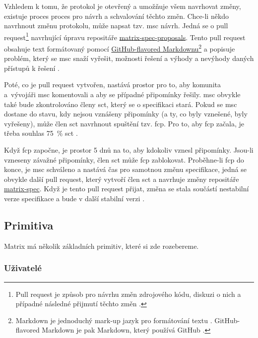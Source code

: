 Vzhledem k tomu, že protokol je otevřený a umožňuje všem navrhovat změny,
existuje proces proces pro návrh a schvalování těchto změn. Chce-li někdo
navrhnout změnu protokolu, může napsat tzv. \gls{msc} návrh. Jedná se o pull
request\footnote{ Pull request je způsob pro návrhu změn zdrojového kódu,
    diskuzi o nich a případné následné přijmutí těchto změn
    \parencite{GitHub-PullRequests}. } navrhující úpravu repositáře
\href{https://github.com/matrix-org/matrix-spec-proposals}{matrix-spec-proposals}.
Tento pull request obsahuje text formátovaný pomocí
\href{https://docs.github.com/en/get-started/writing-on-github/getting-started-with-writing-and-formatting-on-github/basic-writing-and-formatting-syntax}{GitHub-flavored
    Markdownu}\footnote{ Markdown je jednoduchý mark-up jazyk pro formátování textu
    \parencite{JohnGruber-Markdown}. GitHub-flavored Markdown je pak Markdown, který
    používá GitHub \parencite{GitHub-Markdown}. } a popisuje problém, který se
\gls{msc} snaží vyřešit, možnosti řešení a výhody a nevýhody daných přístupů k
řešení \parencite{MatrixORG-MSCs}.

Poté, co je pull request vytvořen, nastává prostor pro to, aby komunita
a~vývojáři \gls{msc} komentovali a aby se případné připomínky řešily. \gls{msc}
obvykle také bude zkontrolováno členy \gls{sct}, který se o specifikaci stará.
Pokud se \gls{msc} dostane do stavu, kdy nejsou vznášeny připomínky (a ty, co
byly vznešené, byly vyřešeny), může člen \gls{sct} navrhnout spuštění tzv.
\gls{fcp}. Pro to, aby \gls{fcp} začala, je třeba souhlas 75~\% \gls{sct}
\parencite{MatrixORG-MSCs}.

Když \gls{fcp} započne, je prostor 5 dnů na to, aby kdokoliv vznesl připomínky.
Jsou-li vzneseny závažné připomínky, člen \gls{sct} může \gls{fcp} zablokovat.
Proběhne-li \gls{fcp} do konce, je \gls{msc} schváleno a nastává čas pro
samotnou změnu specifikace, jedná se obvykle další pull request, který vytvoří
člen \gls{sct} a navrhuje změny repositáře
\href{https://github.com/matrix-org/matrix-spec}{matrix-spec}. Když je tento
pull request přijat, změna se stala součástí nestabilní verze specifikace a bude
v další stabilní verzi \parencite{MatrixORG-MSCs}.

\subsection{Primitiva}

Matrix má několik základních primitiv, které si zde rozebereme.

\subsubsection{Uživatelé}

